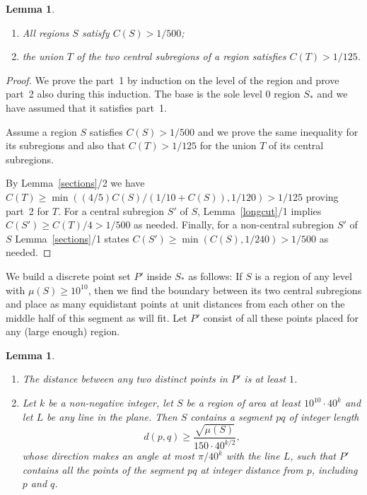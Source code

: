 \documentclass[12pt]{article}
\theoremstyle{plain}
\newtheorem{lemma}[theorem]{Lemma}
\theoremstyle{definition}
\theoremstyle{remark}
\begin{document}
\begin{lemma}\label{kerek}
\begin{enumerate}
\item All regions $S$ satisfy $C(S)>1/500$;
\item the union $T$ of the two central subregions of a region satisfies $C(T)>1/125$.
\end{enumerate}
\end{lemma}

\begin{proof}
We prove the part~1 by induction on the level of the region and prove part~2 also during this induction. The base is the sole level $0$ region $S_*$ and we have assumed that it satisfies part~1.

Assume a region $S$ satisfies $C(S)>1/500$ and we prove the same inequality for its subregions and also that $C(T)>1/125$ for the union $T$ of its central subregions.

By Lemma~\ref{sections}/2 we have $C(T)\ge\min((4/5)C(S)/(1/10+C(S)),1/120)>1/125$ proving part~2 for $T$. For a central subregion $S'$ of $S$, Lemma~\ref{longcut}/1 implies $C(S')\ge C(T)/4>1/500$ as needed. Finally, for a non-central subregion $S'$ of $S$ Lemma~\ref{sections}/1 states $C(S')\ge\min(C(S),1/240)>1/500$ as needed.
\end{proof}

We build a discrete point set $P'$ inside $S_*$ as follows: If $S$ is a region of any level with $\mu(S)\ge10^{10}$, then we find the boundary between its two central subregions and place as many equidistant points at unit distances from each other on the middle half of this segment as will fit. Let $P'$ consist of all these points placed for any (large enough) region.

\begin{lemma}\label{P'}
\begin{enumerate}
\item The distance between any two distinct points in $P'$ is at least $1$.
\item Let $k$ be a non-negative integer, let $S$ be a region of area at least $10^{10}\cdot40^k$ and let $L$ be any line in the plane. Then $S$ contains a segment $pq$ of integer length $$d(p,q)\ge\frac{\sqrt{\mu(S)}}{150\cdot40^{k/2}},$$ whose direction makes an angle at most $\pi/40^k$ with the line $L$, such that $P'$ contains all the points of the segment $pq$ at integer distance from $p$, including $p$ and $q$.
\end{enumerate}
\end{lemma}
\end{document}
